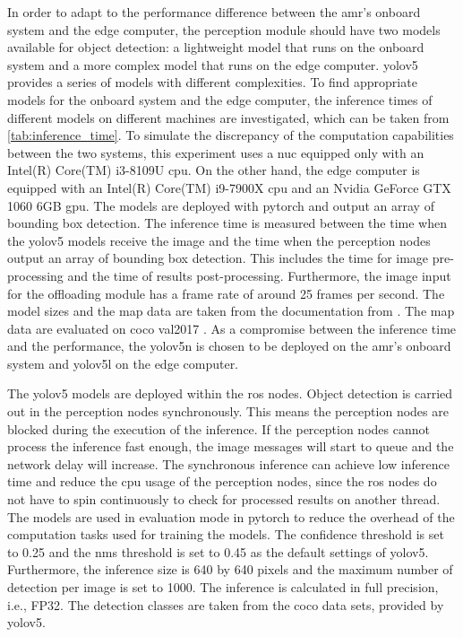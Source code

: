 In order to adapt to the performance difference between the \gls{amr}'s onboard system and the edge computer, the perception module should have two models available for object detection: a lightweight model that runs on the onboard system and a more complex model that runs on the edge computer. \gls{yolo}v5 provides a series of models with different complexities. To find appropriate models for the onboard system and the edge computer, the inference times of different models on different machines are investigated, which can be taken from \cref{tab:inference_time}. To simulate the discrepancy of the computation capabilities between the two systems, this experiment uses a \gls{nuc} equipped only with an Intel(R) Core(TM) i3-8109U \gls{cpu}. On the other hand, the edge computer is equipped with an Intel(R) Core(TM) i9-7900X \gls{cpu} and an Nvidia GeForce GTX 1060 6GB \gls{gpu}. The models are deployed with \gls{pytorch} and output an array of bounding box detection. The inference time is measured between the time when the \gls{yolo}v5 models receive the image and the time when the perception nodes output an array of bounding box detection. This includes the time for image pre-processing and the time of results post-processing. Furthermore, the image input for the offloading module has a frame rate of around 25 frames per second. The model sizes and the \gls{map} data are taken from the documentation from \citeauthor*{Jocher2022} \cite{Jocher2022}. The \gls{map} data are evaluated on \gls{coco} val2017 \cite{Lin2014}. As a compromise between the inference time and the performance, the \gls{yolo}v5n is chosen to be deployed on the \gls{amr}'s onboard system and \gls{yolo}v5l on the edge computer. 

The \gls{yolo}v5 models are deployed within the \gls{ros} nodes. Object detection is carried out in the perception nodes synchronously. This means the perception nodes are blocked during the execution of the inference. If the perception nodes cannot process the inference fast enough, the image messages will start to queue and the network delay will increase. The synchronous inference can achieve low inference time and reduce the \gls{cpu} usage of the perception nodes, since the \gls{ros} nodes do not have to spin continuously to check for processed results on another thread. The models are used in evaluation mode in \gls{pytorch} to reduce the overhead of the computation tasks used for training the models. The confidence threshold is set to 0.25 and the \gls{nms} threshold is set to 0.45 as the default settings of \gls{yolo}v5. Furthermore, the inference size is 640 by 640 pixels and the maximum number of detection per image is set to 1000. The inference is calculated in full precision, i.e., FP32. The detection classes are taken from the \gls{coco} data sets, provided by \gls{yolo}v5. 


